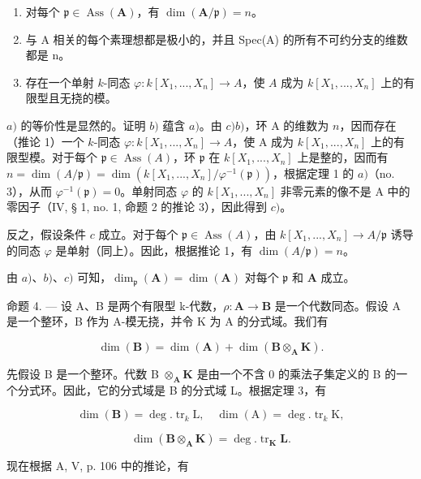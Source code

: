 \begin{enumerate}
\def\labelenumi{\alph{enumi})}
\item
  对每个 \(\mathfrak{p} \in \operatorname{Ass}(\mathbf{A})\)，有 \(\dim(\mathbf{A}/\mathfrak{p}) = n\)。
\item
  与 A 相关的每个素理想都是极小的，并且 Spec(A) 的所有不可约分支的维数都是 n。
\item
存在一个单射 \(k\)-同态 \(\varphi: k[X_1, ..., X_n] \to A\)，使 \(A\) 成为 \(k[X_1, ..., X_n]\) 上的有限型且无挠的模。
\end{enumerate}

\(a)\) 的等价性是显然的。证明 \(b)\) 蕴含 \(a)\)。由 \(c)\)\(b)\)，环 A 的维数为 \(n\)，因而存在（推论 1）一个 \(k\)-同态 \(\varphi : k[X_1, ..., X_n] \to A\)，使 A 成为 \(k[X_1, ..., X_n]\) 上的有限型模。对于每个 \(\mathfrak{p} \in \operatorname{Ass}(A)\)，环 \(\mathfrak{p}\) 在 \(k[X_1, ..., X_n]\) 上是整的，因而有 \(n = \dim(A/\mathfrak{p}) = \dim(k[X_1, ..., X_n]/\varphi^{-1}(\mathfrak{p}))\)，根据定理 1 的 \(a)\)（no. 3），从而 \(\varphi^{-1}(\mathfrak{p}) = 0\)。单射同态 \(\varphi\) 的 \(k[X_1, ..., X_n]\) 非零元素的像不是 A 中的零因子（IV, § 1, no. 1, 命题 2 的推论 3），因此得到 \(c)\)。

反之，假设条件 \(c\) 成立。对于每个 \(\mathfrak{p} \in \operatorname{Ass}(A)\)，由 \(k[X_1, ..., X_n] \to A/\mathfrak{p}\) 诱导的同态 \(\varphi\) 是单射（同上）。因此，根据推论 1，有 \(\dim(A/\mathfrak{p}) = n\)。

由 \(a)\)、\(b)\)、\(c)\) 可知，\(\dim_{\mathfrak{p}}(\mathbf{A}) = \dim(\mathbf{A})\) 对每个 \(\mathfrak{p}\) 和 \(\mathbf{A}\) 成立。

命题 4. --- 设 A、B 是两个有限型 k-代数，\(\rho: \mathbf{A} \to \mathbf{B}\) 是一个代数同态。假设 A 是一个整环，B 作为 A-模无挠，并令 K 为 A 的分式域。我们有

\[
\dim (\mathbf {B}) = \dim (\mathbf {A}) + \dim (\mathbf {B} \otimes_ {\mathbf {A}} \mathbf {K}).
\]

先假设 B 是一个整环。代数 B \(\otimes_{\mathbf{A}} \mathbf{K}\) 是由一个不含 0 的乘法子集定义的 B 的一个分式环。因此，它的分式域是 B 的分式域 L。根据定理 3，有

\[
\dim (\mathbf {B}) = \deg . \operatorname{tr} _ {k} \mathrm{L}, \quad \dim (\mathrm{A}) = \deg . \operatorname{tr} _ {k} \mathrm{K},
\]

\[
\dim (\mathbf {B} \otimes_ {\mathbf {A}} \mathbf {K}) = \deg . \operatorname{tr} _ {\mathbf {K}} \mathbf {L}.
\]

现在根据 A, V, p. 106 中的推论，有

